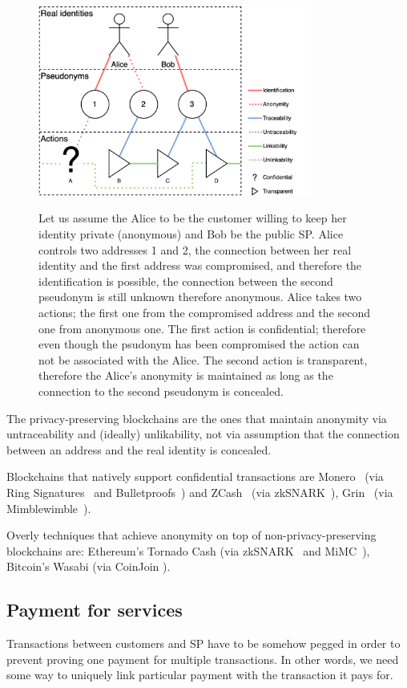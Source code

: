 \documentclass{ieeeaccess}
\begin{document}
\begin{figure}[h!]
\caption{Let us assume the Alice to be the customer willing to keep her identity private (anonymous) and Bob be the public SP. Alice controls two addresses 1 and 2, the connection between her real identity and the first address was compromised, and therefore the identification is possible, the connection between the second pseudonym is still unknown therefore anonymous. Alice takes two actions; the first one from the compromised address and the second one from anonymous one. The first action is confidential; therefore even though the psudonym has been compromised the action can not be associated with the Alice. The second action is transparent, therefore the Alice's anonymity is maintained as long as the connection to the second pseudonym is concealed.}
\centering
\includegraphics[width=9cm]{anonymity-diagram.png}
\label{fig:anonymity-diagram}
\end{figure}


The privacy-preserving blockchains are the ones that maintain anonymity via untraceability and (ideally) unlikability, not via assumption that the connection between an address and the real identity is concealed.   

Blockchains that natively support confidential transactions are
Monero~\cite{van2013cryptonote} (via Ring Signatures~\cite{cryptoeprint:2015:1098} and Bulletproofs~\cite{Bulletpr14, bunz2018bulletproofs}) and ZCash~\cite{sasson2014zerocash} (via zkSNARK~\cite{ben2013snarks}), Grin~\cite{fuchsbauer2019aggregate} (via Mimblewimble~\cite{httpsdow19}).

Overly techniques that achieve anonymity on top of non-privacy-preserving blockchains are: Ethereum's Tornado Cash\cite{pertsev2019tornado} (via zkSNARK~\cite{groth2016size} and MiMC~\cite{albrecht2016mimc}), Bitcoin's Wasabi\cite{WasabiWa56} (via CoinJoin \cite{CoinJoin41}).

\subsection{Payment for services}\label{payment-for-services}
Transactions between customers and SP have to be somehow pegged in order
to prevent proving one payment for multiple transactions. In other
words, we need some way to uniquely link particular payment with the
transaction it pays for.
\end{document}
